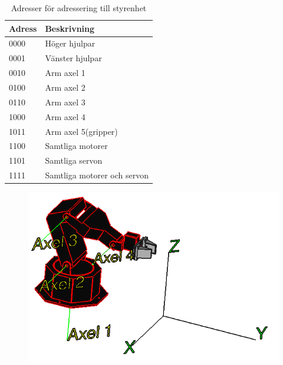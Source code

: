 \begin{table}[h]
	\centering
		\begin{tabularx}{\textwidth}{| l | X |}
			\hline
			\textbf{Adress} & \textbf{Beskrivning} \\
			\hline
			{0000} & {Höger hjulpar} \\
			\hline
			{0001} & {Vänster hjulpar} \\
			\hline
			{0010} & {Arm axel 1} \\ %
			\hline
			{0100} & {Arm axel 2} \\
			\hline
			{0110} & {Arm axel 3} \\
			\hline
			{1000} & {Arm axel 4} \\
			\hline
			{1011} & {Arm axel 5(gripper)} \\ %
			\hline
			{1100} & {Samtliga motorer} \\
			\hline
			{1101} & {Samtliga servon} \\
			\hline
			{1111} & {Samtliga motorer och servon} \\
			\hline
		\end{tabularx}
	\caption{Adresser för adressering till styrenhet} \label{protokoll:pc-motor-adress-tabell}
\end{table}

\begin{figure}[h]
\centerline{\includegraphics[scale=0.4]{robotaxis}}
\caption{}
\end{figure}
